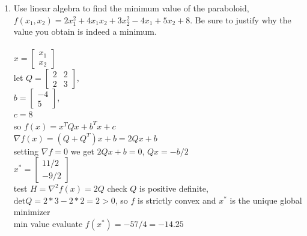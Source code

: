 \documentclass{article}
\begin{document}
{{\begin{enumerate}
\newpage\item Use linear algebra to find the minimum value of the paraboloid, $f(x_1,x_2)=2x_1^2+4x_1x_2+3x_2^2-4x_1+5x_2+8$. Be sure to justify why the value you obtain is indeed a minimum.
\\
\\$x=\left[\begin{array}{c} x_1 \\ x_2 \end{array}\right]$
\\let $Q=\left[\begin{array}{cc} 2 & 2 \\ 2 & 3 \end{array}\right]$,
\\$b=\left[\begin{array}{c} -4 \\ 5 \end{array}\right]$,
\\$c=8$
\\so $f(x)=x^TQx+b^Tx+c$
\\$\nabla f(x)=(Q+Q^T)x+b=2Qx+b$
\\setting $\nabla f=0$ we get $2Qx+b=0$, $Qx=-b/2$
\\$x^*=\left[\begin{array}{c} 11/2 \\ -9/2 \end{array}\right]$
\\test $H=\nabla^2f(x)=2Q$ check $Q$ is positive definite, $\textrm{det}Q=2*3-2*2=2>0$, so $f$ is strictly convex and $x^*$ is the unique global minimizer
\\min value evaluate $f(x^*)=-57/4=-14.25$


\end{enumerate}}}
\end{document}
